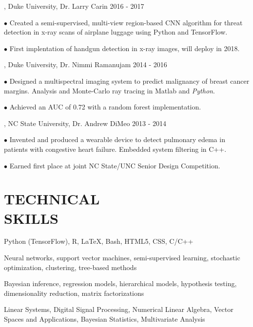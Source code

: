 \documentclass[resmargin, 11pt]{resume_style_class} %
\newenvironment{outline}
  {\begin{list}{}{\setlength{\leftmargin}{30pt}\setlength\itemsep{-2pt}}}
  {\end{list}}
\newenvironment{outline-cond}
  {\begin{list}{}{
  \setlength{\leftmargin}{30pt}
  \setlength\topsep{-10pt}
  \setlength\itemindent{-30pt}
  }}
  {\end{list}}
\begin{document}
\begin{resume}
, Duke University, Dr. Larry Carin \hfill 2016 - 2017
\begin{outline}
\item[$\bullet$\hspace{0.1cm}] Created a semi-supervised, multi-view region-based CNN algorithm for threat detection in x-ray scans of airplane luggage using Python and TensorFlow.
\item[$\bullet$\hspace{0.1cm}] First implentation of handgun detection in x-ray images, will deploy in 2018.
\end{outline}

, Duke University, Dr. Nimmi Ramanujam \hfill 2014 - 2016
\begin{outline}
\item[$\bullet$\hspace{0.1cm}] Designed a multispectral imaging system to predict malignancy of breast cancer margins. Analysis and Monte-Carlo ray tracing in Matlab and \textit{Python}.
\item[$\bullet$\hspace{0.1cm}]  Achieved an AUC of 0.72 with a random forest implementation.
\end{outline}

, NC State University, Dr. Andrew DiMeo \hfill 2013 - 2014
\begin{outline}
\item[$\bullet$\hspace{0.1cm}]  Invented and produced a wearable device to detect pulmonary edema in patients with congestive heart failure. Embedded system filtering in C++.
\item[$\bullet$\hspace{0.1cm}]  Earned first place at joint NC State/UNC Senior Design Competition.
\end{outline}


\section{TECHNICAL \\ SKILLS}
\begin{outline-cond} 
\item {}  Python (TensorFlow), R, \LaTeX, Bash, HTML5, CSS, C/C++
\item {}
Neural networks, support vector machines, semi-supervised learning, stochastic optimization, clustering, tree-based methods
\item {}
Bayesian inference, regression models, hierarchical models, hypothesis testing, dimensionality reduction, matrix factorizations
\item {} 
 Linear Systems, Digital Signal Processing, Numerical Linear Algebra, Vector Spaces and Applications, Bayesian Statistics, Multivariate Analysis
\end{outline-cond}


\end{resume}
\end{document}
